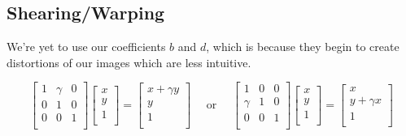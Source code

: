 \documentclass{article}
\begin{document}
\begin{figure}[!htbp]
    \centering
\end{figure}

\begin{figure}[!htbp]
    \centering
\end{figure}


\clearpage
\subsection{Shearing/Warping} 
We're yet to use our coefficients $ b $ and $ d $, which is because they begin
to create distortions of our images which are less intuitive.

\[%
    \begin{bmatrix} 
        1 & \gamma & 0 \\
		0 & 1 & 0 \\
		0 & 0 & 1 \\		
    \end{bmatrix}
    \begin{bmatrix}
        x \\
        y \\
		1 \\		
    \end{bmatrix}
    =
    \begin{bmatrix}
        x + \gamma y \\
        y \\
		1 \\		
    \end{bmatrix}
    \quad
    \text{ or }
    \quad
    \begin{bmatrix} 
        1 & 0 & 0 \\
		\gamma & 1 & 0 \\
		0 & 0 & 1 \\		
    \end{bmatrix}
    \begin{bmatrix}
        x \\
        y \\
		1 \\		
    \end{bmatrix}
    =
    \begin{bmatrix}
        x \\
        y + \gamma x \\
		1 \\		
    \end{bmatrix}
\]%
\end{document}
